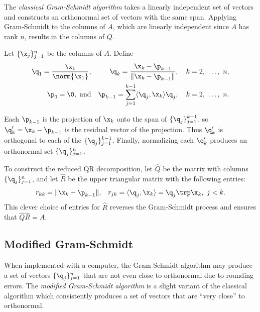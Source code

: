 The \emph{classical Gram-Schmidt algorithm} takes a linearly independent set of vectors and constructs an orthonormal set of vectors with the same span.
Applying Gram-Schmidt to the columns of $A$, which are linearly independent since $A$ has rank $n$, results in the columns of $Q$.

Let $\{\x_j\}_{j=1}^n$ be the columns of $A$.
Define
%
\begin{align*}
\q_1 = \frac{\x_1}{\norm{\x_1}},
&&
\q_{k} = \frac{\x_k - \p_{k-1}}{\|\x_k - \p_{k-1}\|},\quad k=2,\ \ldots,\ n,
\\
\p_0 = \0,\ \text{and}
&&
\p_{k-1} = \sum_{j=1}^{k-1} \langle \q_j, \x_k\rangle \q_j,\quad k=2,\ \ldots,\ n.
\end{align*}

Each $\p_{k-1}$ is the projection of $\x_k$ onto the span of $\{\q_j\}_{j=1}^{k-1}$, so $\q_k^\prime = \x_k - \p_{k-1}$ is the residual vector of the projection.
Thus $\q_k^\prime$ is orthogonal to each of the $\{\q_j\}_{j=1}^{k-1}$.
Finally, normalizing each $\q_k^\prime$ produces an orthonormal set $\{\q_j\}_{j=1}^n$.

To construct the reduced QR decomposition, let $\widehat{Q}$ be the matrix with columns $\{\q_j\}_{j=1}^n$, and let $\widehat{R}$ be the upper triangular matrix with the following entries:
%
\begin{align*}
r_{kk} = \|\x_k-\p_{k-1}\|,
&&
r_{jk} = \langle \q_j, \x_k\rangle = \q_j\trp\x_k,\ j < k.
\end{align*}
%
This clever choice of entries for $\widehat{R}$ reverses the Gram-Schmidt process and ensures that $\widehat{Q}\widehat{R} = A$.

\begin{comment}
To construct the full QR decomposition, choose $m - n$ vectors $\{\x_j\}_{j=n+1}^m$ such that the entire set of original vectors $\{\x_j\}_{j=1}^m$ is linearly independent, then continue the Gram-Schmidt process to produce the additional columns of $Q$.
Appending $m - n$ rows of zeros to $\widehat{R}$ results in $R$.
\end{comment}

\subsection*{Modified Gram-Schmidt} %

When implemented with a computer, the Gram-Schmidt algorithm may produce a set of vectors $\{\q_j\}_{j=1}^n$ that are not even close to orthonormal due to rounding errors.
The \emph{modified Gram-Schmidt algorithm} is a slight variant of the classical algorithm which consistently produces a set of vectors that are ``very close'' to orthonormal.

